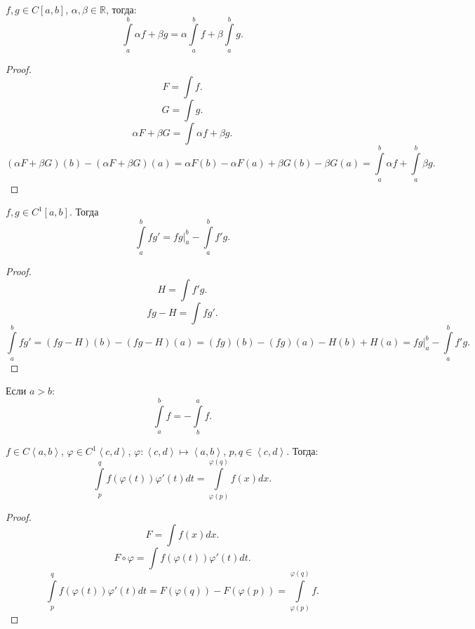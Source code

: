 \documentclass[11pt, oneside]{article}   	%
\begin{document}
   \begin{tlemma}
       $f, g\in C[a, b]$, $\alpha, \beta\in \mathbb{R}$, тогда:
       \[ \int\limits_{a}^{b} \alpha f + \beta g = \alpha \int\limits_{a}^{b} f + \beta \int\limits_{a}^{b} g    .\]
       \begin{proof}
           \[ F = \int f .\]
           \[ G = \int g .\]
           \[ \alpha F + \beta G = \int \alpha f + \beta g .\]
           \[ (\alpha F + \beta G)(b) - (\alpha F + \beta G)(a) = \alpha F(b) - \alpha F(a) + \beta G(b) - \beta G(a) = \int\limits_{a}^{b} \alpha f + \int\limits_{a}^{b} \beta g   .\] 
       \end{proof}
   \end{tlemma}
   \begin{tlemma}
       $f, g\in C^{1}[a,b]$. Тогда
       \[ \int\limits_{a}^{b} fg' = \left. fg\right|_{a}^{b} - \int\limits_{a}^{b} f'g   .\]
        \begin{proof}
            \[ H = \int f'g .\]
            \[ fg - H = \int fg' .\]
            \[ \int\limits_{a}^{b} fg' = (fg-H)(b)-(fg-H)(a) = (fg)(b)-(fg)(a) - H(b)+H(a) = \left.fg\right|_{a}^{b} - \int\limits_{a}^{b} f'g   .\] 
        \end{proof}
   \end{tlemma}
   \begin{definition}
       Если $a>b$:
       \[ \int\limits_{a}^{b} f = - \int\limits_{b}^{a} f   .\] 
   \end{definition}
   \begin{tlemma}
       $f\in C\left<a, b\right>$, $\varphi\in C^{1}\left<c, d\right>$, $\varphi : \left<c, d\right> \mapsto \left<a, b\right>$, $p,q\in \left<c, d\right>$. Тогда:
       \[ \int\limits_{p}^{q} f(\varphi(t))\varphi'(t)dt = \int\limits_{\varphi(p)}^{\varphi(q)} f(x)dx   .\]
       \begin{proof}
           \[ F = \int f(x) dx .\]
           \[ F \circ \varphi = \int f(\varphi(t))\varphi'(t) dt.\]
           \[ \int\limits_{p}^{q} f(\varphi(t))\varphi'(t)dt = F(\varphi(q))-F(\varphi(p)) = \int\limits_{\varphi(p)}^{\varphi(q)} f   .\] 
       \end{proof}
   \end{tlemma}
\end{document}
